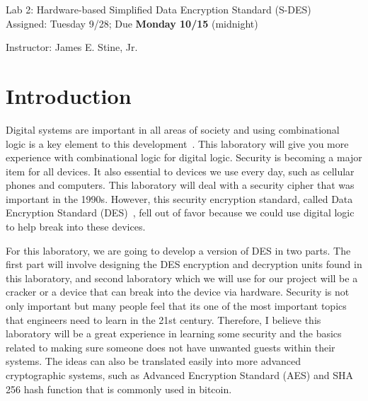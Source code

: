 \documentclass{article}
\newcommand{\myassignment}{Lab 2: Hardware-based Simplified Data Encryption Standard (S-DES)}
\newcommand{\myduedate}{Assigned: Tuesday 9/28; Due \textbf{Monday 10/15} (midnight)}
\newcommand{\myinstructor}{Instructor: James E. Stine, Jr.}
\begin{document}
\begin{center}
  {\huge \myassignment} \\
  {\large \myduedate} \\
  \begin{flushright}
  \myinstructor \\
  \end{flushright}
\end{center}

\section{Introduction}

Digital systems are important in all areas of society and using
combinational logic is a key element to this
development~\cite{10.5555/2815529}.  This
laboratory will give you more experience with combinational logic
for digital logic.  
Security is becoming a major item for all devices.  It also essential
to devices we use every day, such as cellular phones and computers.
This laboratory will deal with a security cipher that was important in
the 1990s.  However, this security encryption standard, called Data
Encryption Standard (DES)~\cite{fips463}, fell out of favor because we could use
digital logic to help break into these devices.

For this laboratory, we are going to develop a version of DES in two
parts.  The first part will involve designing the
DES encryption and decryption units found in this laboratory,
and second laboratory which we will
use for our project will be a cracker or a
device that can break into the device via hardware.
Security is not only important but many people feel that its one of the most important
topics that engineers
need to learn in the 21st century.  Therefore, I
believe this laboratory will be a great experience in learning some
security and the basics related to making sure someone does not have
unwanted guests within their systems.  The ideas can also be
translated easily into more advanced cryptographic systems, such as
Advanced Encryption Standard (AES) and SHA 256 hash function that is
commonly used in bitcoin.
\end{document}
